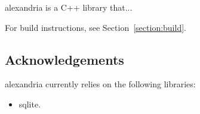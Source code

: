 \gls{alexandria} is a C++ library that...

For build instructions, see Section~\ref{section:build}.

\subsection{Acknowledgements}
\label{section:introduction:acknowledgements}

\gls{alexandria} currently relies on the following libraries:
\begin{itemize}
	\item {} \gls{sqlite}\cite{sqlite}.
\end{itemize}